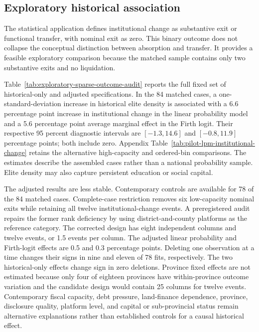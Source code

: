 \subsection{Exploratory historical association}

The statistical application defines institutional change as substantive exit or
functional transfer, with nominal exit as zero. This binary outcome does not
collapse the conceptual distinction between absorption and transfer. It
provides a feasible exploratory comparison because the matched sample contains
only two substantive exits and no liquidation.



Table~\ref{tab:exploratory-sparse-outcome-audit} reports the full fixed set of
historical-only and adjusted specifications. In the 84 matched cases, a
one-standard-deviation increase in historical elite density is associated with
a 6.6 percentage point increase in institutional change in the linear
probability model and a 5.6 percentage point average marginal effect in the
Firth logit. Their respective 95 percent diagnostic intervals are
$[-1.3,14.6]$ and $[-0.8,11.9]$ percentage points; both include zero.
Appendix Table~\ref{tab:pilot-lpm-institutional-change} retains the alternative
high-capacity and ordered-bin comparisons. The estimates describe the
assembled cases rather than a national probability sample. Elite density may
also capture persistent education or social capital.

The adjusted results are less stable. Contemporary controls are available for
78 of the 84 matched cases. Complete-case restriction removes six low-capacity
nominal exits while retaining all twelve institutional-change events. A
preregistered audit repairs the former rank deficiency by using
district-and-county platforms as the reference category. The corrected design
has eight independent columns and twelve events, or 1.5 events per column. The
adjusted linear probability and Firth-logit effects are 0.5 and 0.3 percentage
points. Deleting one observation at a time changes their signs in nine and
eleven of 78 fits, respectively. The two historical-only effects change sign
in zero deletions. Province fixed effects are not estimated because
only four of eighteen provinces have within-province outcome variation and the
candidate design would contain 25 columns for twelve events. Contemporary
fiscal capacity, debt pressure, land-finance dependence,
province, disclosure quality, platform level, and capital or sub-provincial
status remain alternative explanations rather than established controls for a
causal historical effect.

